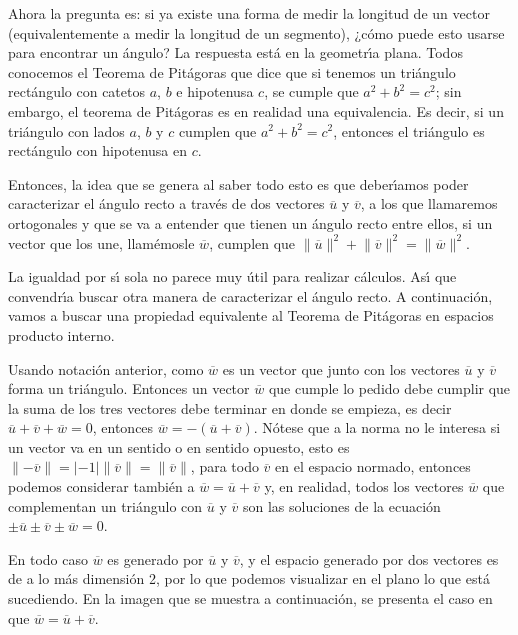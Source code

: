 \documentclass[a4paper,11pt]{article}
\theoremstyle{teoremas}
\theoremstyle{ejemplos}
\theoremstyle{definiciones}
\theoremstyle{lemas}
\begin{document}
Ahora la pregunta es: si ya existe una forma de medir la longitud de un vector (equivalentemente a medir la longitud de un segmento), ¿c\'omo puede esto usarse para encontrar un \'angulo? La respuesta est\'a en la geometr\'{\i}a plana.
Todos conocemos el Teorema de Pit\'agoras que dice que si tenemos un tri\'angulo rect\'angulo con catetos $a$, $b$ e hipotenusa $c$, se cumple que $a^2 + b^2 = c^2$; sin embargo, el teorema de Pit\'agoras es en realidad una equivalencia.
Es decir, si un tri\'angulo con lados $a$, $b$ y $c$ cumplen que $a^2 + b^2 = c^2$, entonces el tri\'angulo es rect\'angulo con hipotenusa en $c$.
\par 
Entonces, la idea que se genera al saber todo esto es que deber\'{\i}amos poder caracterizar el \'angulo recto a trav\'es de dos vectores $\overline{u}$ y $\overline{v}$, a los que llamaremos ortogonales y que se va a entender que tienen un \'angulo recto entre ellos, si un vector que los une, llam\'emosle $\overline{w}$, cumplen que $\lVert \overline{u} \rVert^2 + \lVert \overline{v} \rVert^2 = \lVert \overline{w} \rVert^2$.
\par 
La igualdad por s\'{\i} sola no parece muy \'util para realizar c\'alculos. As\'{\i} que convendr\'{\i}a buscar otra manera de caracterizar el \'angulo recto.
A continuaci\'on, vamos a buscar una propiedad equivalente al Teorema de Pit\'agoras en espacios producto interno.
\par 
Usando notaci\'on anterior, como $\overline{w}$ es un vector que junto con los vectores $\overline{u}$ y $\overline{v}$ forma un tri\'angulo.
Entonces un vector $\overline{w}$ que cumple lo pedido debe cumplir que la suma de los tres vectores debe terminar en donde se empieza, es decir $\overline{u} + \overline{v} + \overline{w} = 0$, entonces $\overline{w} = -\left( \overline{u} + \overline{v} \right)$.
N\'otese que a la norma no le interesa si un vector va en un sentido o en sentido opuesto, esto es $\lVert -\overline{v} \rVert  =  \lvert -1 \rvert \lVert \overline{v} \rVert = \lVert \overline{v} \rVert$, para todo $\overline{v}$ en el espacio normado, entonces podemos considerar tambi\'en a $\overline{w} = \overline{u} + \overline{v}$ y, en realidad, todos los vectores $\overline{w}$ que complementan un tri\'angulo con $\overline{u}$ y $\overline{v}$ son las soluciones de la ecuaci\'on $\pm \overline{u} \pm \overline{v} \pm \overline{w} = 0$.
\par 
En todo caso $\overline{w}$ es generado por $\overline{u}$ y $\overline{v}$, y el espacio generado por dos vectores es de a lo m\'as dimensi\'on 2, por lo que podemos visualizar en el plano lo que est\'a sucediendo. En la imagen que se muestra a continuaci\'on, se presenta el caso en que $\overline{w} = \overline{u} + \overline{v}$.
\end{document}
